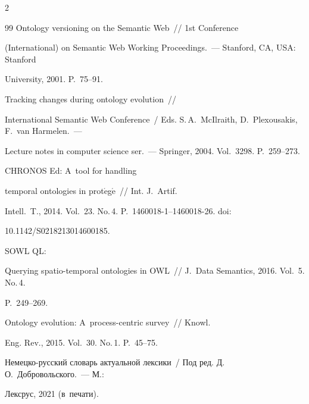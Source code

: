 \begin{multicols}{2}
{{\begin{thebibliography}{99}
 Ontology versioning on the Semantic Web~// 1st  Conference 


(International)  on Semantic Web Working Proceedings.~--- Stanford, CA, USA: Stanford 


University, 2001. P.~75--91.




 Tracking changes during ontology evolution~// 


International Semantic Web Conference~/ Eds. S.\,A.~McIlraith, D.~Plexousakis, F.~van Harmelen.~--- 


Lecture notes in computer science ser.~--- Springer, 2004. Vol.~3298. P.~259--273.




 CHRONOS Ed: A~tool for handling 


temporal ontologies in prot$\acute{\mbox{e}}$g$\acute{\mbox{e}}$~// Int. J.~Artif. 


Intell.~T., 2014. Vol.~23. No.\,4. P.~1460018-1--1460018-26. doi: 


10.1142/S0218213014600185.




 SOWL QL: 


Querying spatio-temporal ontologies in OWL~// J.~Data Semantics, 2016. Vol.~5. No.\,4. 


P.~249--269.




 Ontology evolution: A~process-centric survey~// Knowl. 


Eng. Rev., 2015. Vol.~30. No.\,1. P.~45--75.




Немецко-русский словарь актуальной лексики~/ Под ред. Д.\,О.~Добровольского.~--- М.: 


Лексрус, 2021 (в~печати).


\end{thebibliography}





}


}





\end{multicols}





